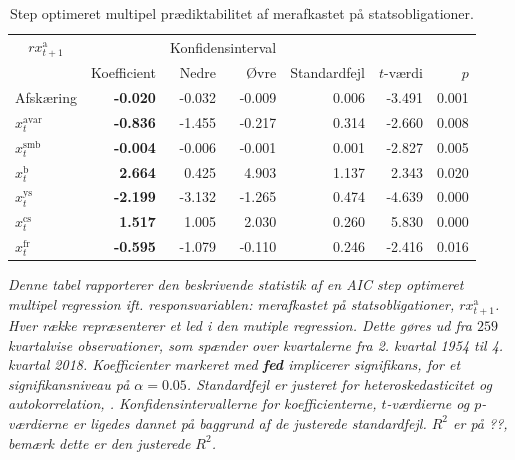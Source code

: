 \documentclass[
  a4paper,
  oneside]{memoir}
\begin{document}
\begin{table}[H]

\caption{\label{tab:MULT-step-s}Step optimeret multipel prædiktabilitet af merafkastet på statsobligationer.}
\centering
\begin{threeparttable}
\begin{tabular}[t]{lrrrrrr}
\toprule
\multicolumn{1}{c}{$rx_{t+1}^{\text{a}}$} & \multicolumn{1}{c}{ } & \multicolumn{2}{c}{Konfidensinterval} & \multicolumn{3}{c}{ } \\
\cmidrule(l{3pt}r{3pt}){1-1} \cmidrule(l{3pt}r{3pt}){3-4}
  & Koefficient & Nedre & Øvre & Standardfejl & $t$-værdi & $p$\\
\midrule
\rowcolor{gray!6}  Afskæring & \textbf{-0.020} & -0.032 & -0.009 & 0.006 & -3.491 & 0.001\\
$x_t^{\text{avar}}$ & \textbf{-0.836} & -1.455 & -0.217 & 0.314 & -2.660 & 0.008\\
\rowcolor{gray!6}  $x_t^{\text{smb}}$ & \textbf{-0.004} & -0.006 & -0.001 & 0.001 & -2.827 & 0.005\\
$x_t^{\text{b}}$ & \textbf{ 2.664} & 0.425 & 4.903 & 1.137 & 2.343 & 0.020\\
\rowcolor{gray!6}  $x_t^{\text{ys}}$ & \textbf{-2.199} & -3.132 & -1.265 & 0.474 & -4.639 & 0.000\\
$x_t^{\text{cs}}$ & \textbf{ 1.517} & 1.005 & 2.030 & 0.260 & 5.830 & 0.000\\
\rowcolor{gray!6}  $x_t^{\text{fr}}$ & \textbf{-0.595} & -1.079 & -0.110 & 0.246 & -2.416 & 0.016\\
\bottomrule
\end{tabular}
\begin{tablenotes}
\item \textit{Denne tabel rapporterer den beskrivende statistik af en AIC step optimeret multipel regression ift. responsvariablen: merafkastet på statsobligationer, $rx_{t+1}^{\text{a}}$. Hver række repræsenterer et led i den mutiple regression. Dette gøres ud fra $259$ kvartalvise observationer, som spænder over kvartalerne fra 2. kvartal 1954 til 4. kvartal 2018. Koefficienter markeret med \textbf{fed} implicerer signifikans, for et signifikansniveau på $\alpha=0.05$. Standardfejl er justeret for heteroskedasticitet og autokorrelation, \citep{Newey1987}. Konfidensintervallerne for koefficienterne, $t$-værdierne og $p$-værdierne er ligedes dannet på baggrund af de justerede standardfejl. $R^2$ er på ??, bemærk dette er den justerede $R^2$.}
\end{tablenotes}
\end{threeparttable}
\end{table}
\end{document}

